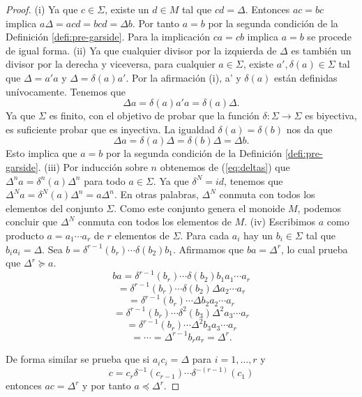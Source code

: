 \documentclass[12pt]{book}
\theoremstyle{definition}
\begin{document}
\begin{proof} (i) Ya que $c\in\Sigma$, existe un $d\in M$ tal que $cd=\Delta$. Entonces $ac=bc$ implica $a\Delta = acd=bcd=\Delta b$. Por tanto $a=b$ por la segunda condición de la Definición \ref{defi:pre-garside}. Para la implicación $ca=cb$ implica $ a=b$ se procede de igual forma.
\newline
\newline
(ii) Ya que cualquier divisor por la izquierda de $\Delta$ es también un divisor por la derecha y viceversa, para cualquier $a\in\Sigma$, existe $a',\delta(a)\in\Sigma$ tal que $\Delta =a'a$ y $\Delta = \delta(a)a'$. Por la afirmación (i), a' y $\delta(a)$ están definidas unívocamente. Tenemos que
\begin{equation}
\Delta a=\delta(a)a'a=\delta(a)\Delta.
\label{eq:deltas}
\end{equation}
Ya que $\Sigma$ es finito, con el objetivo de probar que la función $\delta:\Sigma\rightarrow\Sigma$ es biyectiva, es suficiente probar que es inyectiva. La igualdad $\delta(a)=\delta(b)$ nos da que
$$\Delta a= \delta(a)\Delta = \delta(b)\Delta = \Delta b.$$
Esto implica que $a=b$ por la segunda condición de la Definición \ref{defi:pre-garside}.
\newline
\newline
(iii) Por inducción sobre $n$ obtenemos de (\ref{eq:deltas}) que $\Delta^na=\delta^n(a)\Delta^n$ para todo $a\in\Sigma$. Ya que $\delta^N=id$, tenemos que $\Delta^N a=\delta^N(a)\Delta^n=a\Delta^n$. En otras palabras, $\Delta^N$ conmuta con todos los elementos del conjunto $\Sigma$. Como este conjunto genera el monoide $M$, podemos concluir que $\Delta^N$ conmuta con todos los elementos de $M$.
\newline
\newline
(iv) Escribimos $a$ como producto $a=a_1\cdots a_r$ de $r$ elementos de $\Sigma$. Para cada $a_i$ hay un $b_i\in\Sigma$ tal que $b_ia_i=\Delta$. Sea $b=\delta^{r-1}(b_r)\cdots\delta(b_2)b_1$. Afirmamos que $ba=\Delta^r$, lo cual prueba que $\Delta^r\succeq a$.
$$ba=\delta^{r-1}(b_r)\cdots\delta(b_2)b_1a_1\cdots a_r$$
$$=\delta^{r-1}(b_r)\cdots\delta(b_2)\Delta a_2\cdots a_r$$
$$=\delta^{r-1}(b_r)\cdots\Delta b_2a_2\cdots a_r$$
$$=\delta^{r-1}(b_r)\cdots\delta^2(b_3)\Delta^2 a_3\cdots a_r$$
$$=\delta^{r-1}(b_r)\cdots\Delta^2 b_3a_3\cdots a_r$$
$$=\cdots= \Delta^{r-1}b_ra_r=\Delta^r.$$

De forma similar se prueba que si $a_ic_i=\Delta$ para $i=1,\ldots,r$ y
$$c=c_r\delta^{-1}(c_{r-1})\cdots\delta^{-(r-1)}(c_1)$$
entonces $ac=\Delta^r$ y por tanto $a\preceq\Delta^r$.
\end{proof}
\end{document}

